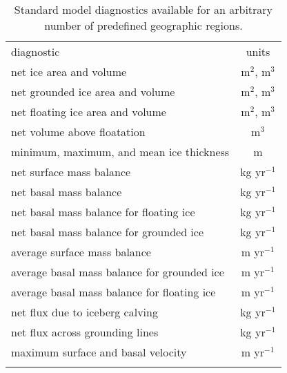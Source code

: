 \begin{table*}[t]
\caption{Standard model diagnostics available for an arbitrary number of predefined geographic regions.
}
\begin{tabular}{lc}
\tophline
diagnostic & units \\
\middlehline
net ice area and volume & m$^2$, m$^3$ \\
net grounded ice area and volume & m$^2$, m$^3$ \\
net floating ice area and volume & m$^2$, m$^3$ \\
net volume above floatation & m$^3$ \\
minimum, maximum, and mean ice thickness & m \\
net surface mass balance & kg yr$^{-1}$ \\
net basal mass balance & kg yr$^{-1}$ \\
net basal mass balance for floating ice & kg yr$^{-1}$ \\
net basal mass balance for grounded ice & kg yr$^{-1}$ \\
average surface mass balance & m yr$^{-1}$ \\
average basal mass balance for grounded ice & m yr$^{-1}$ \\
average basal mass balance for floating ice & m yr$^{-1}$ \\
net flux due to iceberg calving & kg yr$^{-1}$ \\
net flux across grounding lines & kg yr$^{-1}$ \\
maximum surface and basal velocity & m yr$^{-1}$ \\
\bottomhline
\end{tabular}
\belowtable{} %
\label{table:analysisVars}
\end{table*}


